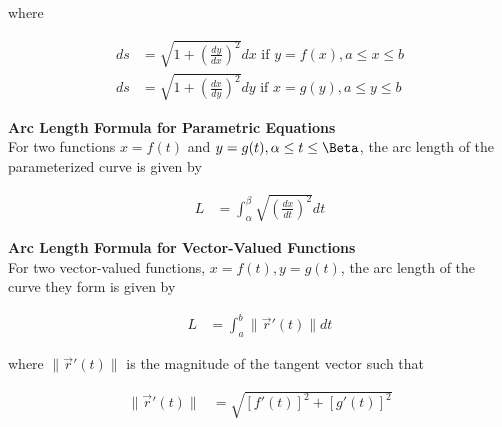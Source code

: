         \noindent where

        \begin{align*}
            ds &= \sqrt{1+\left(\frac{dy}{dx}\right)^2}dx \text{ if } y=f(x),a\leq x\leq b \\
            ds &= \sqrt{1+\left(\frac{dx}{dy}\right)^2}dy \text{ if } x=g(y),a\leq y\leq b
        \end{align*}

        \noindent \color{purple} \textbf{Arc Length Formula for Parametric Equations} \color{black} \\

        \noindent For two functions $x=f(t)$ and $y=g(t), \alpha\leq t\leq \Beta$, the arc length
        of the parameterized curve is given by

        \begin{align*}
            L &= \int^\beta_\alpha \sqrt{\left(\frac{dx}{dt}\right)^2}dt
        \end{align*}

        \noindent \color{purple} \textbf{Arc Length Formula for Vector-Valued Functions} \color{black} \\

        \noindent For two vector-valued functions, $x=f(t),y=g(t)$, the arc length of the curve
        they form is given by

        \begin{align*}
            L   &= \int^b_a \| \overrightarrow{r}'(t)\| dt
        \end{align*}

        \noindent where $\|\overrightarrow{r}'(t)\|$ is the magnitude of the tangent vector such
        that

        \begin{align*}
            \|\overrightarrow{r}'(t)\|    &= \sqrt{[f'(t)]^2+[g'(t)]^2}
        \end{align*}